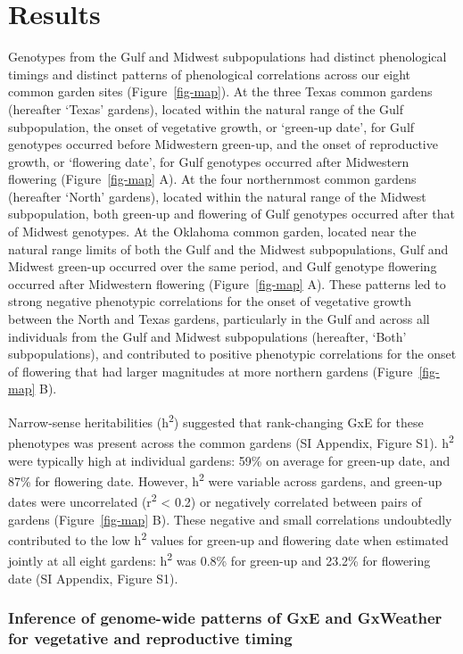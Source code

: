 \documentclass[
  9pt,
  twocolumn,
  twoside]{pnas-new}
\begin{document}
\section{Results}\label{results}

Genotypes from the Gulf and Midwest subpopulations had distinct
phenological timings and distinct patterns of phenological correlations
across our eight common garden sites (Figure~\ref{fig-map}). At the
three Texas common gardens (hereafter `Texas' gardens), located within
the natural range of the Gulf subpopulation, the onset of vegetative
growth, or `green-up date', for Gulf genotypes occurred before
Midwestern green-up, and the onset of reproductive growth, or `flowering
date', for Gulf genotypes occurred after Midwestern flowering
(Figure~\ref{fig-map} A). At the four northernmost common gardens
(hereafter `North' gardens), located within the natural range of the
Midwest subpopulation, both green-up and flowering of Gulf genotypes
occurred after that of Midwest genotypes. At the Oklahoma common garden,
located near the natural range limits of both the Gulf and the Midwest
subpopulations, Gulf and Midwest green-up occurred over the same period,
and Gulf genotype flowering occurred after Midwestern flowering
(Figure~\ref{fig-map} A). These patterns led to strong negative
phenotypic correlations for the onset of vegetative growth between the
North and Texas gardens, particularly in the Gulf and across all
individuals from the Gulf and Midwest subpopulations (hereafter, `Both'
subpopulations), and contributed to positive phenotypic correlations for
the onset of flowering that had larger magnitudes at more northern
gardens (Figure~\ref{fig-map} B).

Narrow-sense heritabilities (h\textsuperscript{2}) suggested that
rank-changing GxE for these phenotypes was present across the common
gardens (SI Appendix, Figure S1). h\textsuperscript{2} were typically
high at individual gardens: 59\% on average for green-up date, and 87\%
for flowering date. However, h\textsuperscript{2} were variable across
gardens, and green-up dates were uncorrelated (r\textsuperscript{2}
\textless{} 0.2) or negatively correlated between pairs of gardens
(Figure~\ref{fig-map} B). These negative and small correlations
undoubtedly contributed to the low h\textsuperscript{2} values for
green-up and flowering date when estimated jointly at all eight gardens:
h\textsuperscript{2} was 0.8\% for green-up and 23.2\% for flowering
date (SI Appendix, Figure S1).

\subsubsection{Inference of genome-wide patterns of GxE and GxWeather
for vegetative and reproductive
timing}\label{inference-of-genome-wide-patterns-of-gxe-and-gxweather-for-vegetative-and-reproductive-timing}
\end{document}
